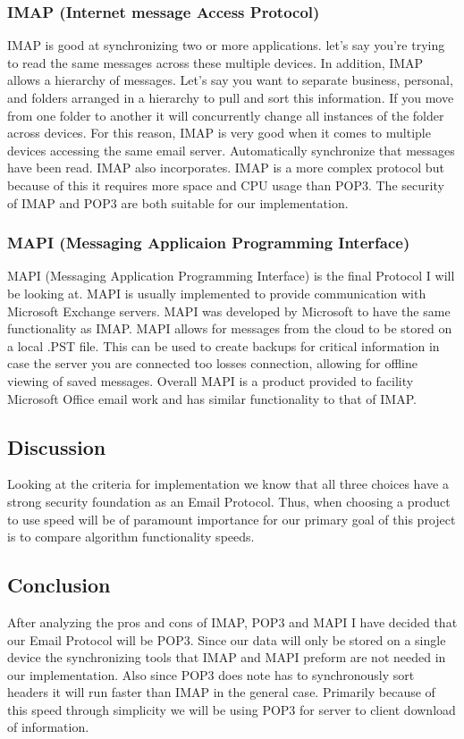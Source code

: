 \subsubsection{ IMAP (Internet message Access Protocol) }
IMAP is good at synchronizing two or more applications. let’s say you’re trying to read the same messages across these multiple devices. In addition, IMAP allows a hierarchy of messages. Let’s say you want to separate business, personal, and folders arranged in a hierarchy to pull and sort this information.  If you move from one folder to another it will concurrently change all instances of the folder across devices. For this reason, IMAP is very good when it comes to multiple devices accessing the same email server. Automatically synchronize that messages have been read. IMAP also incorporates. IMAP is a more complex protocol but because of this it requires more space and CPU usage than POP3. The security of IMAP and POP3 are both suitable for our implementation.
\subsubsection{ MAPI (Messaging Applicaion Programming Interface) }
MAPI (Messaging Application Programming Interface) is the final Protocol I will be looking at. MAPI is usually implemented to provide communication with Microsoft Exchange servers. MAPI was developed by Microsoft to have the same functionality as IMAP. MAPI allows for messages from the cloud to be stored on a local .PST file. This can be used to create backups for critical information in case the server you are connected too losses connection, allowing for offline viewing of saved messages. Overall MAPI is a product provided to facility Microsoft Office email work and has similar functionality to that of IMAP.
\subsection{ Discussion }
Looking at the criteria for implementation we know that all three choices have a strong security foundation as an Email Protocol. Thus, when choosing a product to use speed will be of paramount importance for our primary goal of this project is to compare algorithm functionality speeds.
\subsection{ Conclusion }
After analyzing the pros and cons of IMAP, POP3 and MAPI I have decided that our Email Protocol will be POP3. Since our data will only be stored on a single device the synchronizing tools that IMAP and MAPI preform are not needed in our implementation. Also since POP3 does note has to synchronously sort headers it will run faster than IMAP in the general case. Primarily because of this speed through simplicity we will be using POP3 for server to client download of information.



